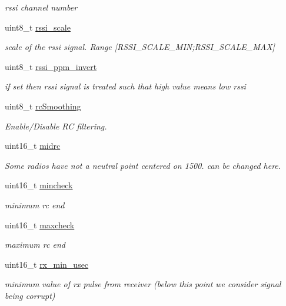 \begin{DoxyCompactItemize}
\begin{DoxyCompactList}\small\item\em rssi channel number \end{DoxyCompactList}\item 
uint8\+\_\+t \hyperlink{structrx__config_a0dc3cd39fba01b57143e0a65f421126c}{rssi\+\_\+scale}
\begin{DoxyCompactList}\small\item\em scale of the rssi signal. Range \mbox{[}R\+S\+S\+I\+\_\+\+S\+C\+A\+L\+E\+\_\+\+M\+I\+N;R\+S\+S\+I\+\_\+\+S\+C\+A\+L\+E\+\_\+\+M\+A\+X\mbox{]} \end{DoxyCompactList}\item 
uint8\+\_\+t \hyperlink{structrx__config_ad67738c81cf1ae5770fe4a6bd731e207}{rssi\+\_\+ppm\+\_\+invert}
\begin{DoxyCompactList}\small\item\em if set then rssi signal is treated such that high value means low rssi \end{DoxyCompactList}\item 
uint8\+\_\+t \hyperlink{structrx__config_a78c1783d3447facd6ef8a949ae506c0a}{rc\+Smoothing}
\begin{DoxyCompactList}\small\item\em Enable/\+Disable R\+C filtering. \end{DoxyCompactList}\item 
uint16\+\_\+t \hyperlink{structrx__config_a68cff5e9b0d5293c363a2b596f45d8c7}{midrc}
\begin{DoxyCompactList}\small\item\em Some radios have not a neutral point centered on 1500. can be changed here. \end{DoxyCompactList}\item 
uint16\+\_\+t \hyperlink{structrx__config_aec056aabcb236e2a86679cd296047fb1}{mincheck}
\begin{DoxyCompactList}\small\item\em minimum rc end \end{DoxyCompactList}\item 
uint16\+\_\+t \hyperlink{structrx__config_a55f92cef1541599a3a0ded8524ecba74}{maxcheck}
\begin{DoxyCompactList}\small\item\em maximum rc end \end{DoxyCompactList}\item 
uint16\+\_\+t \hyperlink{structrx__config_a086895901d9b2a9e2d5682cc82c05bac}{rx\+\_\+min\+\_\+usec}
\begin{DoxyCompactList}\small\item\em minimum value of rx pulse from receiver (below this point we consider signal being corrupt) \end{DoxyCompactList}\item 

\end{DoxyCompactItemize}
